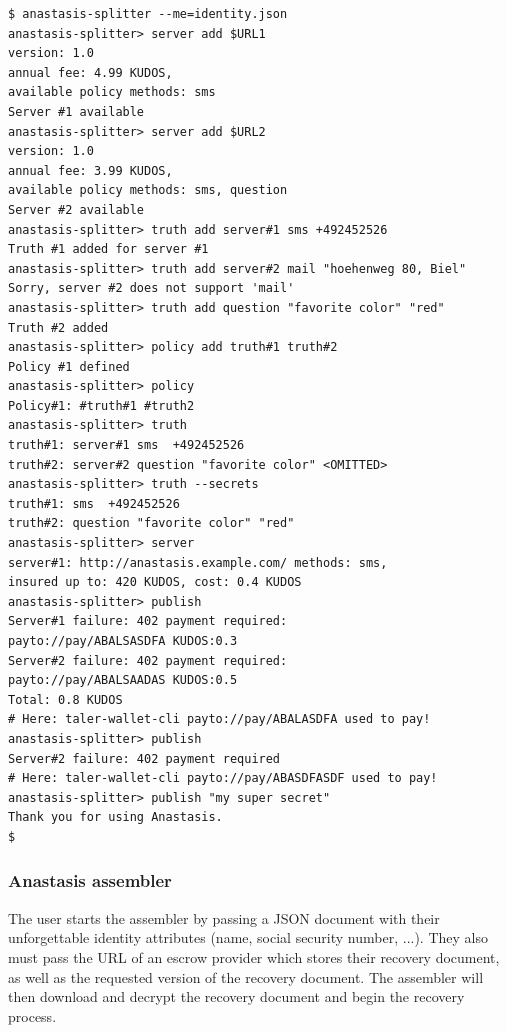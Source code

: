 \begin{lstlisting}
$ anastasis-splitter --me=identity.json
anastasis-splitter> server add $URL1
version: 1.0
annual fee: 4.99 KUDOS,
available policy methods: sms
Server #1 available
anastasis-splitter> server add $URL2
version: 1.0
annual fee: 3.99 KUDOS,
available policy methods: sms, question
Server #2 available
anastasis-splitter> truth add server#1 sms +492452526
Truth #1 added for server #1
anastasis-splitter> truth add server#2 mail "hoehenweg 80, Biel"
Sorry, server #2 does not support 'mail'
anastasis-splitter> truth add question "favorite color" "red"
Truth #2 added
anastasis-splitter> policy add truth#1 truth#2
Policy #1 defined
anastasis-splitter> policy
Policy#1: #truth#1 #truth2
anastasis-splitter> truth
truth#1: server#1 sms  +492452526
truth#2: server#2 question "favorite color" <OMITTED>
anastasis-splitter> truth --secrets
truth#1: sms  +492452526
truth#2: question "favorite color" "red"
anastasis-splitter> server
server#1: http://anastasis.example.com/ methods: sms,
insured up to: 420 KUDOS, cost: 0.4 KUDOS
anastasis-splitter> publish
Server#1 failure: 402 payment required:
payto://pay/ABALSASDFA KUDOS:0.3
Server#2 failure: 402 payment required:
payto://pay/ABALSAADAS KUDOS:0.5
Total: 0.8 KUDOS
# Here: taler-wallet-cli payto://pay/ABALASDFA used to pay!
anastasis-splitter> publish
Server#2 failure: 402 payment required
# Here: taler-wallet-cli payto://pay/ABASDFASDF used to pay!
anastasis-splitter> publish "my super secret"
Thank you for using Anastasis.
$
\end{lstlisting}

\subsubsection{Anastasis assembler}

The user starts the assembler by passing a JSON document with their
unforgettable identity attributes (name, social security number, ...).
They also must pass the URL of an escrow provider which stores their
recovery document, as well as the requested version of the recovery
document. The assembler will then download and decrypt the recovery
document and begin the recovery process.


